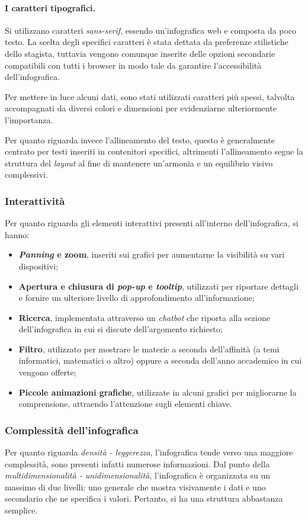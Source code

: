 \paragraph{I caratteri tipografici.} Si utilizzano caratteri \emph{sans-serif}, essendo un'infografica web e composta da poco testo. La scelta degli specifici caratteri è stata dettata da preferenze stilistiche
dello stagista, tuttavia vengono comunque inserite delle opzioni secondarie compatibili con tutti i browser in modo tale da garantire l'accessibilità dell'infografica.

Per mettere in luce alcuni dati, sono stati utilizzati caratteri più spessi, talvolta accompagnati da diversi colori e dimensioni per evidenziarne ulteriormente l'importanza.

Per quanto riguarda invece l'allineamento del testo, questo è generalmente centrato per testi inseriti in contenitori specifici, altrimenti l'allineamento segue
la struttura del \emph{layout} al fine di mantenere un'armonia e un equilibrio visivo complessivi.

\subsubsection{Interattività}
Per quanto riguarda gli elementi interattivi presenti all'interno dell'infografica, si hanno:
\begin{itemize}
    \item \textbf{\emph{Panning} e zoom}, inseriti sui grafici per aumentarne la visibilità su vari dispositivi;
    \item \textbf{Apertura e chiusura di \emph{pop-up} e \emph{tooltip}}, utilizzati per riportare dettagli e fornire un ulteriore livello di 
    approfondimento all'informazione;
    \item \textbf{Ricerca}, implementata attraverso un \emph{chatbot} che riporta alla sezione dell'infografica in cui si discute dell'argomento richiesto; 
    \item \textbf{Filtro}, utilizzato per mostrare le materie a seconda dell'affinità (a temi informatici, matematici o altro) oppure a seconda dell'anno 
    accademico in cui vengono offerte;
    \item \textbf{Piccole animazioni grafiche}, utilizzate in alcuni grafici per migliorarne la comprensione, attraendo l'attenzione sugli elementi chiave.
\end{itemize}

\subsubsection{Complessità dell'infografica}
Per quanto riguarda \emph{densità - leggerezza}, l'infografica tende verso una maggiore complessità, sono presenti infatti numerose informazioni.
Dal punto della \emph{multidimensionalità - unidimensionalità}, l'infografica è organizzata su un massimo di due livelli: uno generale che mostra visivamente i dati e 
uno secondario che ne specifica i valori. Pertanto, si ha una struttura abbastanza semplice.

